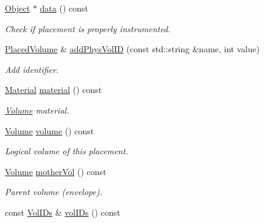 \begin{DoxyCompactItemize}
\hyperlink{class_d_d4hep_1_1_geometry_1_1_placed_volume_extension}{Object} $\ast$ \hyperlink{class_d_d4hep_1_1_geometry_1_1_placed_volume_ac13225b8f8408419cc0dd096f59cc934}{data} () const 
\begin{DoxyCompactList}\small\item\em Check if placement is properly instrumented. \item\end{DoxyCompactList}\item 
\hyperlink{class_d_d4hep_1_1_geometry_1_1_placed_volume}{PlacedVolume} \& \hyperlink{class_d_d4hep_1_1_geometry_1_1_placed_volume_a461228a5c2a8347d0445d64a351e117a}{addPhysVolID} (const std::string \&name, int value)
\begin{DoxyCompactList}\small\item\em Add identifier. \item\end{DoxyCompactList}\item 
\hyperlink{class_d_d4hep_1_1_geometry_1_1_material}{Material} \hyperlink{class_d_d4hep_1_1_geometry_1_1_placed_volume_a15e211be65f8a1eacb9c2abcb21d27f7}{material} () const 
\begin{DoxyCompactList}\small\item\em \hyperlink{class_d_d4hep_1_1_geometry_1_1_volume}{Volume} material. \item\end{DoxyCompactList}\item 
\hyperlink{class_d_d4hep_1_1_geometry_1_1_volume}{Volume} \hyperlink{class_d_d4hep_1_1_geometry_1_1_placed_volume_a7896af4481e228014289900a8943a7da}{volume} () const 
\begin{DoxyCompactList}\small\item\em Logical volume of this placement. \item\end{DoxyCompactList}\item 
\hyperlink{class_d_d4hep_1_1_geometry_1_1_volume}{Volume} \hyperlink{class_d_d4hep_1_1_geometry_1_1_placed_volume_add53ed67151813db86d2a26a8184d14d}{motherVol} () const 
\begin{DoxyCompactList}\small\item\em Parent volume (envelope). \item\end{DoxyCompactList}\item 
const \hyperlink{class_d_d4hep_1_1_geometry_1_1_placed_volume_extension_1_1_vol_i_ds}{VolIDs} \& \hyperlink{class_d_d4hep_1_1_geometry_1_1_placed_volume_af7478d475c0719d37ebadc8d18ba12ba}{volIDs} () const 

\end{DoxyCompactItemize}
